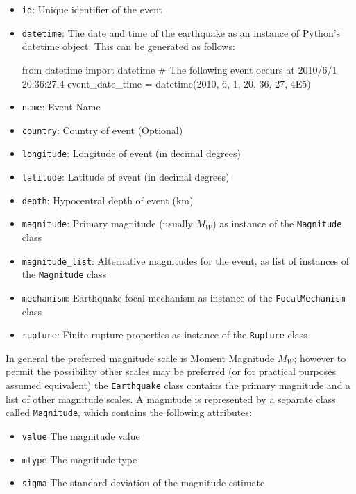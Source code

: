 \begin{itemize}
\item \verb=id=: Unique identifier of the event
\item \verb=datetime=: The date and time of the earthquake as an instance of Python's datetime object. This can be generated as follows:
\begin{python}
from datetime import datetime
# The following event occurs at 2010/6/1 20:36:27.4
event_date_time = datetime(2010, 6, 1, 20, 36, 27, 4E5)
\end{python}
\item \verb=name=: Event Name
\item \verb=country=: Country of event (Optional)
\item \verb=longitude=: Longitude of event (in decimal degrees)
\item \verb=latitude=: Latitude of event (in decimal degrees)
\item \verb=depth=: Hypocentral depth of event (km)
\item \verb=magnitude=: Primary magnitude (usually $M_W$) as instance of the \verb=Magnitude= class
\item \verb=magnitude_list=: Alternative magnitudes for the event, as list of instances of the \verb=Magnitude= class
\item \verb=mechanism=: Earthquake focal mechanism as instance of the \verb=FocalMechanism= class
\item \verb=rupture=: Finite rupture properties as instance of the \verb=Rupture= class
\end{itemize}

In general the preferred magnitude scale is Moment Magnitude $M_W$; however to permit the possibility other scales may be preferred (or for practical purposes assumed equivalent) the \verb=Earthquake= class contains the primary magnitude and a list of other magnitude scales. A magnitude is represented by a separate class called \verb=Magnitude=, which contains the following attributes:

\begin{itemize}
\item \verb=value= The magnitude value
\item \verb=mtype= The magnitude type
\item \verb=sigma= The standard deviation of the magnitude estimate
\end{itemize}

